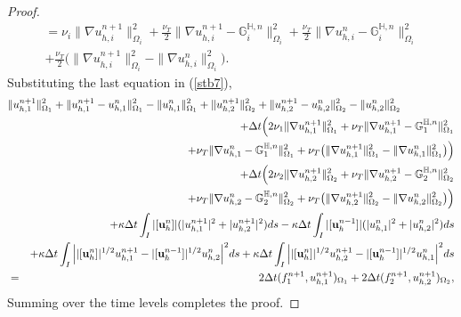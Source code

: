 \documentclass[10pt]{article}%
\numberwithin{equation}{section}
\newcommand{\bff}{{  f}}
\newcommand{\bu}{{\bf u}}
\begin{document}
\begin{proof}
\begin{eqnarray}
=
\nu_i\|\nabla  u_{h,i}^{n+1}\|^2_{\Omega_i} + \frac{\nu_T}{2}\|\nabla  u_{h,i}^{n+1} - \mathbb{G}_i^{\mathbb{H},n}\|^2_{\Omega_i}
+\frac{\nu_T}{2} \|\nabla  u_{h,i}^{n} - \mathbb{G}_i^{\mathbb{H},n}\|^2_{\Omega_i} \nonumber \\
+\frac{\nu_T}{2}\big(\|\nabla  u_{h,i}^{n+1}\|^2_{\Omega_i}
-\|\nabla  u_{h,i}^{n}\|^2_{\Omega_i}\big).
\nonumber
\end{eqnarray}
	Substituting the last equation in (\ref{stb7}),
\begin{eqnarray}
	\lefteqn{\|{u^{n+1}_{h,1}}\|_{\Omega_1}^2+\|{{u^{n+1}_{h,1}}-u_{h,1}^{n}}\|_{\Omega_1}^2-\|{u^{n}_{h,1}}\|_{\Omega_1}^2 +\|{u^{n+1}_{h,2}}\|_{\Omega_2}^2+\|{{u^{n+1}_{h,2}}-u_{h,2}^{n}}\|_{\Omega_2}^2-\|{u^{n}_{h,2}}\|_{\Omega_2}^2}\nonumber\\
&&+\Delta t\Big(
2\nu_1\|\nabla  u_{h,1}^{n+1}\|^2_{\Omega_1} + \nu_T\|\nabla  u_{h,1}^{n+1} - \mathbb{G}_1^{\mathbb{H},n}\|^2_{\Omega_1}  \nonumber \\
&&+\nu_T \|\nabla  u_{h,1}^{n} - \mathbb{G}_1^{\mathbb{H},n}\|^2_{\Omega_1}+\nu_T\big(\|\nabla  u_{h,1}^{n+1}\|^2_{\Omega_1}
-\|\nabla  u_{h,1}^{n}\|^2_{\Omega_1}\big)
\Big) \nonumber\\
&&+\Delta t\Big(
2\nu_2\|\nabla  u_{h,2}^{n+1}\|^2_{\Omega_2} + \nu_T\|\nabla  u_{h,2}^{n+1} - \mathbb{G}_2^{\mathbb{H},n}\|^2_{\Omega_2}  \nonumber \\
&&+\nu_T \|\nabla  u_{h,2}^{n} - \mathbb{G}_2^{\mathbb{H},n}\|^2_{\Omega_2}+\nu_T\big(\|\nabla  u_{h,2}^{n+1}\|^2_{\Omega_2}
-\|\nabla  u_{h,2}^{n}\|^2_{\Omega_2}\big)
\Big) \nonumber\\
	&&+\kappa \Delta t \int_{I}|[\bu_h^n]| (|u_{h,1}^{n+1}|^2+|u_{h,2}^{n+1}|^2)ds
	- \kappa \Delta t\int_{I}|[\bu_h^{n-1}]| (|u_{h,1}^{n}|^2+|u_{h,2}^{n}|^2)ds\nonumber\\
	&&+\kappa \Delta t \int_{I}\Big{|}|[\bu_h^n]|^{1/2}u_{h,1}^{n+1}-|[\bu_h^{n-1}]|^{1/2}u_{h,2}^{n}\Big{|}^2ds
	+\kappa \Delta t \int_{I}\Big{|}|[\bu_h^n]|^{1/2}u_{h,2}^{n+1}-|[\bu_h^{n-1}]|^{1/2}u_{h,1}^{n}\Big{|}^2ds \nonumber\\
	&=&2\Delta t(\bff_1^{n+1},u_{h,1}^{n+1})_{\Omega_1}+2\Delta t(\bff_2^{n+1},u_{h,2}^{n+1})_{\Omega_2},\label{stb8}
	\end{eqnarray}
	Summing over the time levels completes the proof.
\end{proof}
\end{document}
